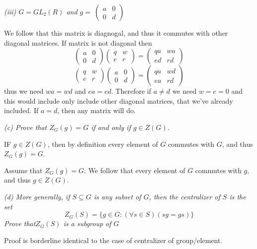 \documentclass[11pt,oneside,titlepage]{book}
\newcommand{\set}[1]{\{ #1 \}}
\begin{document}
\textit{(iii) $G = GL_2(R)$ and $g = \
  \begin{pmatrix} a & 0 \\ 0 & d
  \end{pmatrix} $ }

We follow that this matrix is diagnogal, and thus it commutes with
other diagonal matrices. If matrix is not diagonal then
$$
  \begin{pmatrix} a & 0 \\ 0 & d
  \end{pmatrix}
  \begin{pmatrix} q & w \\ e & r
  \end{pmatrix} =
  \begin{pmatrix} qa & wa \\ ed & rd
  \end{pmatrix}
  $$
  $$
  \begin{pmatrix} q & w \\ e & r
  \end{pmatrix}
  \begin{pmatrix} a & 0 \\ 0 & d
  \end{pmatrix} =
  \begin{pmatrix} qa & wd \\ ea & rd
  \end{pmatrix}
  $$
  thus we need $wa = wd$ and $ea = ed$. Therefore if $a \neq d$ we
need $w = e = 0$ and this would include only include other diagonal
matrices, that we've already included. If $a = d$, then any matrix
will do.

\textit{(c) Prove that $Z_G(g) = G$ if and only if $g \in Z(G)$.}

IF $g \in Z(G)$, then by definition every element of $G$ commutes with
$G$, and thus $Z_G(g) = G$.

Assume that $Z_G(g) = G$. We follow that every element of $G$ commutes
with $g$, and thus $g \in Z(G)$.

\textit{(d) More generally, if $S \subseteq G$ is any subset of $G$,
then the centralizer of $S$ is the set
  $$Z_G(S) = \set{g \in G: (\forall s \in S)(sg = gs)}$$
  Prove that$ Z_G(S)$ is a subgroup of $G$ }

Proof is borderline identical to the case of centralizer of
group/element.

\subsection{}
\end{document}
